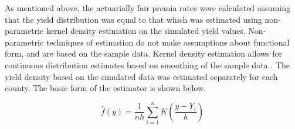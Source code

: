 As mentioned above, the actuarially fair premia rates were calculated assuming that the yield distribution was equal to that which was estimated using non-parametric kernel density estimation on the simulated yield values. Non-parametric techniques of estimation do not make assumptions about functional form, and are based on the sample data. Kernel density estimation allows for continuous distribution estimates based on smoothing of the sample data \citep{ker2000nonparametric}. The yield density based on the simulated data was estimated separately for each county. The basic form of the estimator is shown below.

\begin{equation}
    \hat{f}(y)=\frac{1}{nh}\sum_{i=1}^{n}K\left(\frac{y-Y_i}{h}\right)
\end{equation}

